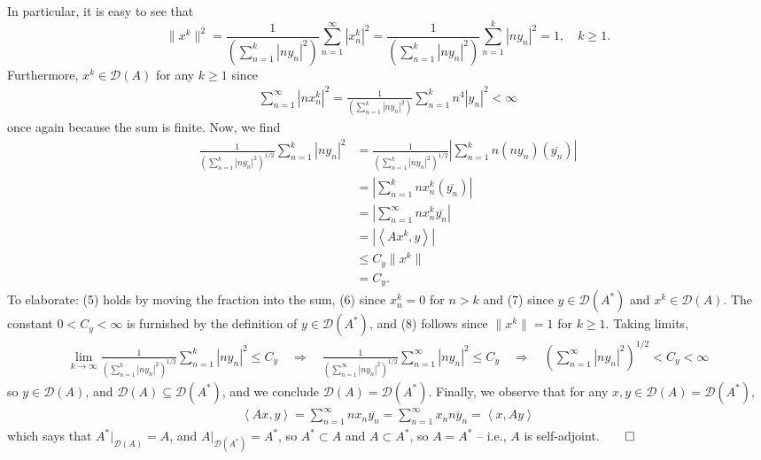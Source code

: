 \documentclass[10pt]{article}
\newcommand{\1}[1]{\mathbbm{1}_{#1}} \newcommand{\mc}[1]{\mathcal{#1}}
\newcommand{\ip}[2]{\left\langle#1,#2\right\rangle }
\begin{document}
    In particular, it is easy to see that
    \[\|x^k\|^2=\frac{1}{\left(\sum_{n=1}^k|ny_n|^2\right)}\sum_{n=1}^\infty |x^k_n|^2=\frac{1}{\left(\sum_{n=1}^k|ny_n|^2\right)}\sum_{n=1}^k |ny_n|^2=1,\quad k\geq 1.\]
    Furthermore, $x^k\in\mc{D}(A)$ for any $k\geq 1$ since 
    \begin{align*}
        \sum_{n=1}^\infty |nx^k_n|^2=\frac{1}{\left(\sum_{n=1}^k|ny_n|^2\right)}\sum_{n=1}^kn^4|y_n|^2<\infty
    \end{align*}
    once again because the sum is finite. Now, we find
    \begin{align*}
        \frac{1}{\left(\sum_{n=1}^k|ny_n|^2\right)^{1/2}}\sum_{n=1}^k|ny_n|^2&=\frac{1}{\left(\sum_{n=1}^k|ny_n|^2\right)^{1/2}}\left|\sum_{n=1}^kn(ny_n)(\overline{y_n})\right|\\
        &=\left|\sum_{n=1}^knx^k_n(\overline{y_n})\right|\tag{5}\\
        &=\left|\sum_{n=1}^\infty nx^k_n\overline{y_n}\right|\tag{6}\\
        &=\left|\ip{Ax^k}{y}\right|\\
        &\leq C_y\|x^k\|\tag{7}\\
        &=C_y.\tag{8}
    \end{align*}
    To elaborate: (5) holds by moving the fraction into the sum, (6) since $x^k_n=0$ for $n>k$ and (7) since $y\in\mc{D}(A^\ast)$ and $x^k\in\mc{D}(A)$. The constant $0<C_y<\infty$ is furnished by the definition of $y\in\mc{D}(A^\ast)$, and (8)
    follows since $\|x^k\|=1$ for $k\geq 1$. Taking limits,
    \begin{align*}
        \lim_{k\rightarrow\infty}\frac{1}{\left(\sum_{n=1}^k|ny_n|^2\right)^{1/2}}\sum_{n=1}^k|ny_n|^2\leq C_y\quad\Rightarrow\quad\frac{1}{\left(\sum_{n=1}^\infty|ny_n|^2\right)^{1/2}}\sum_{n=1}^\infty|ny_n|^2\leq C_y\quad\Rightarrow\quad \left(\sum_{n=1}^\infty|ny_n|^2\right)^{1/2}<C_y<\infty
    \end{align*}
    so $y\in\mc{D}(A)$, and $\mc{D}(A)\subseteq\mc{D}(A^\ast)$, and we conclude $\mc{D}(A)=\mc{D}(A^\ast)$. Finally, we observe that for any $x,y\in\mc{D}(A)=\mc{D}(A^\ast)$,
    \begin{align*}
        \ip{Ax}{y}=\sum_{n=1}^\infty nx_n\overline{y_n}=\sum_{n=1}^\infty x_n\overline{ny_n}=\ip{x}{Ay}
    \end{align*}
    which says that $A^\ast\big|_{\mc{D}(A)}=A$, and $A\big|_{\mc{D}(A^\ast)}=A^\ast$, so $A^\ast\subset A$ and $A\subset A^\ast$, so $A=A^\ast$ -- i.e., $A$ is self-adjoint.\hfill{$\qed$}
    
\end{document}
